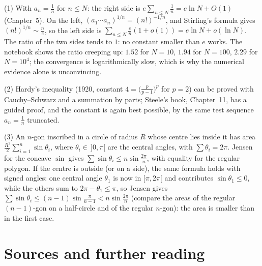 (1) With $a_n=\frac1n$ for $n\le N$: the right side is $e\sum_{n\le N}\frac1n=e\ln N+O(1)$ (Chapter~5). On the left, $(a_1\cdots a_n)^{1/n}=(n!)^{-1/n}$, and Stirling's formula gives $(n!)^{1/n}\sim\frac ne$, so the left side is $\sum_{n\le N}\frac en(1+o(1))=e\ln N+o(\ln N)$. The ratio of the two sides tends to $1$: no constant smaller than $e$ works. The notebook shows the ratio creeping up: $1.52$ for $N=10$, $1.94$ for $N=100$, $2.29$ for $N=10^4$; the convergence is logarithmically slow, which is why the numerical evidence alone is unconvincing.

(2) Hardy's inequality (1920, constant $4=\bigl(\frac p{p-1}\bigr)^p$ for $p=2$) can be proved with Cauchy--Schwarz and a summation by parts; Steele's book, Chapter~11, has a guided proof, and the constant is again best possible, by the same test sequence $a_n=\frac1n$ truncated.

(3) An $n$-gon inscribed in a circle of radius $R$ whose centre lies inside it has area $\frac{R^2}2\sum_{i=1}^n\sin\theta_i$, where $\theta_i\in\,]0,\pi[$ are the central angles, with $\sum\theta_i=2\pi$. Jensen for the concave $\sin$ gives $\sum\sin\theta_i\le n\sin\frac{2\pi}n$, with equality for the regular polygon. If the centre is outside (or on a side), the same formula holds with signed angles: one central angle $\theta_1$ is now in $[\pi,2\pi[$ and contributes $\sin\theta_1\le0$, while the others sum to $2\pi-\theta_1\le\pi$, so Jensen gives $\sum\sin\theta_i\le(n-1)\sin\frac{\pi}{n-1}<n\sin\frac{2\pi}n$ (compare the areas of the regular $(n-1)$-gon on a half-circle and of the regular $n$-gon): the area is smaller than in the first case.

\section*{Sources and further reading}

